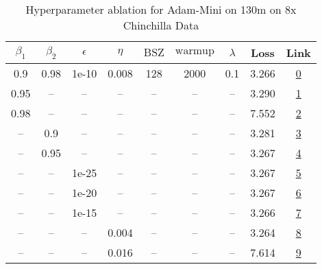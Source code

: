 \begin{table}[H]
\centering
\caption{Hyperparameter ablation for Adam-Mini on 130m on 8x Chinchilla Data}
\label{tab:ablation_adam-mini_130m_8}
\begin{tabular}{ccccccccc}
\toprule
$\beta_1$ & $\beta_2$ & $\epsilon$ & $\eta$ & $\mathrm{BSZ}$ & $\mathrm{warmup}$ & $\lambda$ & Loss & Link \\
\midrule
0.9 & 0.98 & 1e-10 & 0.008 & 128 & 2000 & 0.1 & 3.266 & \href{https://wandb.ai/stanford-mercury/optimizer-scaling/runs/sweep-130m-21B-miniac2e1elr0.008-wd0.1-minlr0-warmup2000-b10.9-b-d489dc}{0} \\
\midrule
0.95 & -- & -- & -- & -- & -- & -- & 3.290 & \href{https://wandb.ai/stanford-mercury/optimizer-scaling/runs/sweep-130m-21B-mini117b84lr0.008-wd0.1-minlr0-warmup2000-b10.95--817e0e}{1} \\
0.98 & -- & -- & -- & -- & -- & -- & 7.552 & \href{https://wandb.ai/stanford-mercury/optimizer-scaling/runs/sweep-130m-21B-mini9179b1lr0.008-wd0.1-minlr0-warmup2000-b10.98--93bc9f}{2} \\
-- & 0.9 & -- & -- & -- & -- & -- & 3.281 & \href{https://wandb.ai/stanford-mercury/optimizer-scaling/runs/sweep-130m-21B-minic5318dlr0.008-wd0.1-minlr0-warmup2000-b10.9-b-6f8a67}{3} \\
-- & 0.95 & -- & -- & -- & -- & -- & 3.267 & \href{https://wandb.ai/stanford-mercury/optimizer-scaling/runs/sweep-130m-21B-minic96875lr0.008-wd0.1-minlr0-warmup2000-b10.9-b-fa1dd8}{4} \\
-- & -- & 1e-25 & -- & -- & -- & -- & 3.267 & \href{https://wandb.ai/stanford-mercury/optimizer-scaling/runs/sweep-130m-21B-minidd3b3clr0.008-wd0.1-minlr0-warmup2000-b10.9-b-1d94ce}{5} \\
-- & -- & 1e-20 & -- & -- & -- & -- & 3.267 & \href{https://wandb.ai/stanford-mercury/optimizer-scaling/runs/sweep-130m-21B-mini88561dlr0.008-wd0.1-minlr0-warmup2000-b10.9-b-f66e88}{6} \\
-- & -- & 1e-15 & -- & -- & -- & -- & 3.266 & \href{https://wandb.ai/stanford-mercury/optimizer-scaling/runs/sweep-130m-21B-mini3c1780lr0.008-wd0.1-minlr0-warmup2000-b10.9-b-9a05a7}{7} \\
-- & -- & -- & 0.004 & -- & -- & -- & 3.264 & \href{https://wandb.ai/stanford-mercury/optimizer-scaling/runs/sweep-130m-21B-mini5c5f85lr0.004-wd0.1-minlr0-warmup2000-b10.9-b-eaf3db}{8} \\
-- & -- & -- & 0.016 & -- & -- & -- & 7.614 & \href{https://wandb.ai/stanford-mercury/optimizer-scaling/runs/sweep-130m-21B-minidb82b6lr0.016-wd0.1-minlr0-warmup2000-b10.9-b-765b78}{9} \\

\end{tabular}
\end{table}
